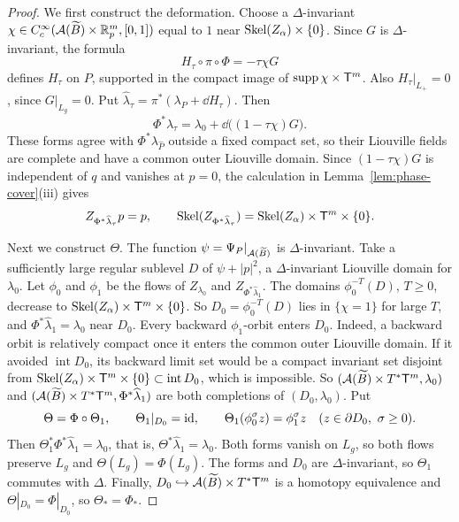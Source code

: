 \documentclass[12pt, letter]{amsart}
\theoremstyle{definition}
\begin{document}
\begin{proof}
We first construct the deformation.
Choose a $\Delta$-invariant $\chi\in C^\infty_c(\mathcal{A}(\widetilde B)\times\mathbb{R}^m_p,[0,1])$ equal to $1$ near $\operatorname{Skel}(Z_\alpha)\times\{0\}$.
Since $G$ is $\Delta$-invariant, the formula
\[
 H_\tau\circ\pi\circ\Phi=-\tau\chi G
\]
defines $H_\tau$ on $P$, supported in the compact image of $\operatorname{supp}\chi\times\mathsf T^m$.
Also $H_\tau|_{L_+}=0$, since $G|_{L_g}=0$.
Put $\widehat\lambda_\tau=\pi^*(\lambda_P+\dd H_\tau)$.
Then
\[
 \Phi^*\widehat\lambda_\tau=\lambda_0+\dd\bigl((1-\tau\chi)G\bigr).
\]
These forms agree with $\Phi^*\lambda_{\widehat P}$ outside a fixed compact set, so their Liouville fields are complete and have a common outer Liouville domain.
Since $(1-\tau\chi)G$ is independent of $q$ and vanishes at $p=0$, the calculation in Lemma~\ref{lem:phase-cover}(iii) gives
\[
 Z_{\Phi^*\widehat\lambda_\tau}p=p,\qquad
 \operatorname{Skel}(Z_{\Phi^*\widehat\lambda_\tau})=\operatorname{Skel}(Z_\alpha)\times\mathsf T^m\times\{0\}.
\]

Next we construct $\Theta$.
The function $\psi=\Psi_P|_{\mathcal{A}(\widetilde B)}$ is $\Delta$-invariant.
Take a sufficiently large regular sublevel $D$ of $\psi+|p|^2$, a $\Delta$-invariant Liouville domain for $\lambda_0$.
Let $\phi_0$ and $\phi_1$ be the flows of $Z_{\lambda_0}$ and $Z_{\Phi^*\widehat\lambda_1}$.
The domains $\phi_0^{-T}(D)$, $T\ge0$, decrease to $\operatorname{Skel}(Z_\alpha)\times\mathsf T^m\times\{0\}$.
So $D_0=\phi_0^{-T}(D)$ lies in $\{\chi=1\}$ for large $T$, and $\Phi^*\widehat\lambda_1=\lambda_0$ near $D_0$.
Every backward $\phi_1$-orbit enters $D_0$.
Indeed, a backward orbit is relatively compact once it enters the common outer Liouville domain.
If it avoided $\operatorname{int}D_0$, its backward limit set would be a compact invariant set disjoint from $\operatorname{Skel}(Z_\alpha)\times\mathsf T^m\times\{0\}\subset\operatorname{int}D_0$, which is impossible.
So $(\mathcal{A}(\widetilde B)\times T^*\mathsf T^m,\lambda_0)$ and $(\mathcal{A}(\widetilde B)\times T^*\mathsf T^m,\Phi^*\widehat\lambda_1)$ are both completions of $(D_0,\lambda_0)$.
Put
\[
 \Theta=\Phi\circ\Theta_1,\qquad \Theta_1|_{D_0}=\mathrm{id},\qquad \Theta_1(\phi_0^\sigma z)=\phi_1^\sigma z\quad(z\in\partial D_0,\ \sigma\ge0).
\]
Then $\Theta_1^*\Phi^*\widehat\lambda_1=\lambda_0$, that is, $\Theta^*\widehat\lambda_1=\lambda_0$.
Both forms vanish on $L_g$, so both flows preserve $L_g$ and $\Theta(L_g)=\Phi(L_g)$.
The forms and $D_0$ are $\Delta$-invariant, so $\Theta_1$ commutes with $\Delta$.
Finally, $D_0\hookrightarrow\mathcal{A}(\widetilde B)\times T^*\mathsf T^m$ is a homotopy equivalence and $\Theta|_{D_0}=\Phi|_{D_0}$, so $\Theta_*=\Phi_*$.
\end{proof}
\end{document}
